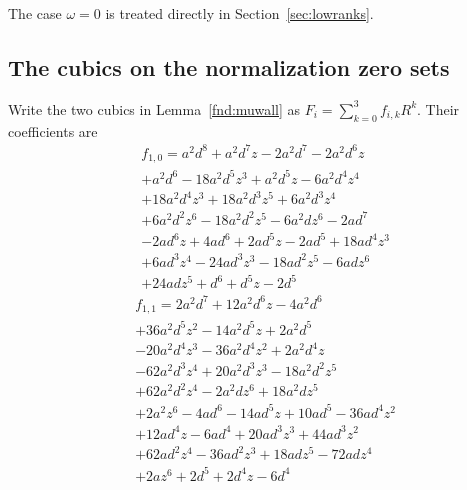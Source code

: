\documentclass[11pt,a4paper]{article}
\numberwithin{equation}{section}
\theoremstyle{plain}
\theoremstyle{definition}
\theoremstyle{remark}
\begin{document}
The case $\omega=0$ is treated directly in Section~\ref{sec:lowranks}.

\subsection{The cubics on the normalization zero sets}\label{appn:mucubics}

Write the two cubics in Lemma~\ref{fnd:muwall} as
$F_i=\sum_{k=0}^3f_{i,k}R^k$. Their coefficients are
\begin{equation}\begin{aligned}&f_{1,0}=a^{2} d^{8} + a^{2} d^{7} z - 2 a^{2} d^{7} - 2 a^{2} d^{6} z \\&+ a^{2} d^{6} - 18 a^{2} d^{5} z^{3} + a^{2} d^{5} z - 6 a^{2} d^{4} z^{4} \\&+ 18 a^{2} d^{4} z^{3} + 18 a^{2} d^{3} z^{5} + 6 a^{2} d^{3} z^{4} \\&+ 6 a^{2} d^{2} z^{6} - 18 a^{2} d^{2} z^{5} - 6 a^{2} d z^{6} - 2 a d^{7} \\&- 2 a d^{6} z + 4 a d^{6} + 2 a d^{5} z - 2 a d^{5} + 18 a d^{4} z^{3} \\&+ 6 a d^{3} z^{4} - 24 a d^{3} z^{3} - 18 a d^{2} z^{5} - 6 a d z^{6} \\&+ 24 a d z^{5} + d^{6} + d^{5} z - 2 d^{5}\end{aligned}\end{equation}
\begin{equation}\begin{aligned}&f_{1,1}=2 a^{2} d^{7} + 12 a^{2} d^{6} z - 4 a^{2} d^{6} \\&+ 36 a^{2} d^{5} z^{2} - 14 a^{2} d^{5} z + 2 a^{2} d^{5} \\&- 20 a^{2} d^{4} z^{3} - 36 a^{2} d^{4} z^{2} + 2 a^{2} d^{4} z \\&- 62 a^{2} d^{3} z^{4} + 20 a^{2} d^{3} z^{3} - 18 a^{2} d^{2} z^{5} \\&+ 62 a^{2} d^{2} z^{4} - 2 a^{2} d z^{6} + 18 a^{2} d z^{5} \\&+ 2 a^{2} z^{6} - 4 a d^{6} - 14 a d^{5} z + 10 a d^{5} - 36 a d^{4} z^{2} \\&+ 12 a d^{4} z - 6 a d^{4} + 20 a d^{3} z^{3} + 44 a d^{3} z^{2} \\&+ 62 a d^{2} z^{4} - 36 a d^{2} z^{3} + 18 a d z^{5} - 72 a d z^{4} \\&+ 2 a z^{6} + 2 d^{5} + 2 d^{4} z - 6 d^{4}\end{aligned}\end{equation}
\end{document}
